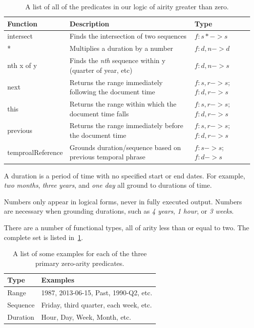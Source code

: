 \begin{table}[tp]
\begin{tabular}{|l|l|l|}
  \hline
  \textbf{Function} & \textbf{Description} & \textbf{Type} \\
  \hline \hline
  intersect & Finds the intersection of two sequences & $f:s* -> s$ \\
  \hline
  * & Multiplies a duration by a number & $f:d,n -> d$ \\
  \hline
  nth x of y & Finds the \emph{nth} sequence within y (quarter of year, etc)& $f:d,n -> s$ \\
  \hline
  next & Returns the range immediately following the document time & $f:s,r -> s$; $f:d,r -> s$ \\
  \hline
  this & Returns the range within which the document time falls & $f:s,r -> s$; $f:d,r -> s$ \\
  \hline
  previous & Returns the range immediately before the document time & $f:s,r -> s$; $f:d,r -> s$ \\
  \hline
  temproalReference & Grounds duration/sequence based on previous temporal phrase & $f:s -> s$; $f:d -> s$ \\
  \hline
\end{tabular}
  \caption{A list of all of the predicates in our logic of airity greater than zero.}
  \label{table:functions}
\end{table}

\begin{definition}[Duration]
A duration is a period of time with no specified start or end dates. For example, \emph{two months}, \emph{three years}, and \emph{one day} all ground to durations of time. 
\end{definition}

\begin{definition}[Number]
Numbers only appear in logical forms, never in fully executed output. Numbers are necessary when grounding durations, such as \emph{4 years}, \emph{1 hour}, or \emph{3 weeks}. 
\end{definition}

\begin{definition}
There are a number of functional types, all of arity less than or equal to two. The complete set is listed in~\ref{table:functions}.
\end{definition}



\begin{table}
 \begin{tabular}{|l|l|}
  \hline
  \textbf{Type} & \textbf{Examples} \\
  \hline \hline
  Range & 1987, 2013-06-15, Past, 1990-Q2, etc. \\
  Sequence & Friday, third quarter, each week, etc. \\
  Duration & Hour, Day, Week, Month, etc. \\
  \hline
 \end{tabular}
 \caption{A list of some examples for each of the three primary zero-arity predicates.}
\end{table}

